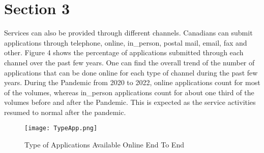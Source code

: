 \section{Section 3}

Services can also be provided through different channels. Canadians can submit applications through telephone, online, 
in\_person, postal mail, email, fax and other. Figure 4 shows the percentage 
of applications submitted through each channel over the past few years. One 
can find the overall trend of the number of applications that can be done 
online for each type of channel during the past few years. During the Pandemic 
from 2020 to 2022, online applications count for most of the volumes, whereas 
in\_person applications count for about one third of the volumes before and 
after the Pandemic. This is expected as the service activities resumed to 
normal after the pandemic.

\begin{figure}[H]
    \centering
    \texttt{[image: TypeApp.png]}
    \caption{\label{fig:TypeApp}Type of Applications Available Online End To End}
\end{figure}
